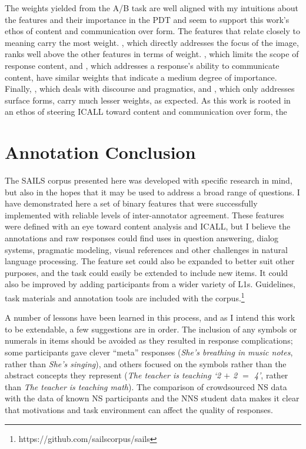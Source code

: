 The weights yielded from the A/B task are well aligned with my intuitions about the features and their importance in the PDT and seem to support this work's ethos of content and communication over form. The features that relate closely to meaning carry the most weight. , which directly addresses the focus of the image, ranks well above the other features in terms of weight. , which limits the scope of response content, and , which addresses a response's ability to communicate content, have similar weights that indicate a medium degree of importance. Finally, , which deals with discourse and pragmatics, and , which only addresses surface forms, carry much lesser weights, as expected. As this work is rooted in an ethos of steering ICALL toward content and communication over form, the 

\section{Annotation Conclusion}

The SAILS corpus presented here was developed with specific research in mind, but also in the hopes that it may be used to address a broad range of questions. I have demonstrated here a set of binary features that were successfully implemented with reliable levels of inter-annotator agreement. These features were defined with an eye toward content analysis and ICALL, but I believe the annotations and raw responses could find uses in question answering, dialog systems, pragmatic modeling, visual references and other challenges in natural language processing. The feature set could also be expanded to better suit other purposes, and the task could easily be extended to include new items. It could also be improved by adding participants from a wider variety of L1s. Guidelines, task materials and annotation tools are included with the corpus.\footnote{https://github.com/sailscorpus/sails}

A number of lessons have been learned in this process, and as I intend this work to be extendable, a few suggestions are in order. The inclusion of any symbols or numerals in items should be avoided as they resulted in response complications; some participants gave clever ``meta'' responses (\textit{She's breathing in music notes}, rather than \textit{She's singing}), and others focused on the symbols rather than the abstract concepts they represent (\textit{The teacher is teaching `2 $+$ 2 $=$ 4'}, rather than \textit{The teacher is teaching math}). The comparison of crowdsourced NS data with the data of known NS participants and the NNS student data makes it clear that motivations and task environment can affect the quality of responses.

